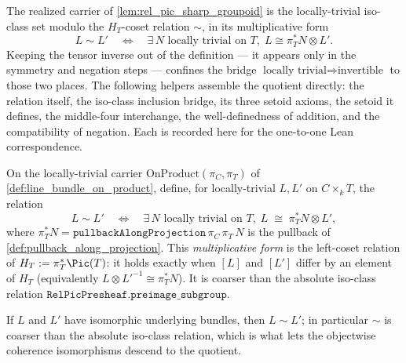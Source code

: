The realized carrier of \cref{lem:rel_pic_sharp_groupoid} is the
locally-trivial iso-class set modulo the \(H_T\)-coset relation \(\sim\), in
its multiplicative form
\[
  L \sim L' \quad\Longleftrightarrow\quad
    \exists\, N \text{ locally trivial on } T,\;
    L \cong \pi_T^* N \otimes L' .
\]
Keeping the tensor inverse out of the definition --- it appears only in the
symmetry and negation steps --- confines the bridge
\(\text{locally trivial} \Rightarrow \text{invertible}\) to those two
places. The following helpers assemble the quotient directly: the relation
itself, the iso-class inclusion bridge, its three setoid axioms, the setoid it
defines, the middle-four interchange, the well-definedness of addition, and
the compatibility of negation. Each is recorded here for the one-to-one Lean
correspondence.

\begin{definition}
  \label{lem:relpic_rel}
  On the locally-trivial carrier \(\mathrm{OnProduct}(\pi_C, \pi_T)\) of
  \cref{def:line_bundle_on_product}, define, for locally-trivial \(L, L'\) on
  \(C \times_k T\), the relation
  \[
    L \sim L' \quad\Longleftrightarrow\quad
      \exists\, N \text{ locally trivial on } T,\;
      L \;\cong\; \pi_T^* N \otimes L' ,
  \]
  where \(\pi_T^* N = \mathtt{pullbackAlongProjection}\,\pi_C\,\pi_T\,N\) is the
  pullback of \cref{def:pullback_along_projection}. This \emph{multiplicative
  form} is the left-coset relation of \(H_T := \pi_T^*\Pic(T)\): it holds exactly
  when \([L]\) and \([L']\) differ by an element of \(H_T\) (equivalently
  \(L \otimes L'^{-1} \cong \pi_T^* N\)). It is coarser than the absolute
  iso-class relation \(\mathtt{RelPicPresheaf.preimage\_subgroup}\).
\end{definition}

\begin{lemma}
  \label{lem:relpic_rel_of_iso}
  If \(L\) and \(L'\) have isomorphic underlying bundles, then \(L \sim L'\); in
  particular \(\sim\) is coarser than the absolute iso-class relation, which is
  what lets the objectwise coherence isomorphisms descend to the quotient.
\end{lemma}

